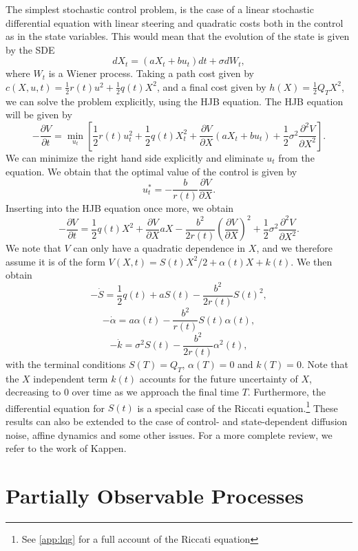 The simplest stochastic control problem, is the case of a linear stochastic differential equation with linear steering and quadratic costs both in the control as in the state variables. This would mean that the evolution of the state is given by the SDE
\begin{equation}
\label{eq:ctl_diff_dyn}
dX_t = \left(a X_t + b u_t\right) dt + \sigma dW_t,
\end{equation}
where $W_t$ is a Wiener process. Taking a path cost given by $c(X,u,t) = \frac{1}{2} r(t) u^2 + \frac{1}{2} q(t) X^2$, and a final cost given by $h(X) = \frac{1}{2} Q_T X^2$, we can solve the problem explicitly, using the HJB equation. The HJB equation will be given by
$$
-\frac{\partial V}{\partial t} = \min_{u_t} \left[\frac{1}{2} r(t) u_t^2 + \frac{1}{2} q(t) X_t^2 + \frac{\partial V}{\partial X} \left(aX_t  + bu_t\right) + \frac{1}{2}\sigma^2 \frac{\partial^2 V}{\partial X^2} \right].
$$
We can minimize the right hand side explicitly and eliminate $u_t$ from the equation. We obtain that the optimal value of the control is given by
$$
u^*_t = -\frac{b}{r(t)} \frac{\partial V}{\partial X}.
$$
Inserting into the HJB equation once more, we obtain
$$
-\frac{\partial V}{\partial t} = \frac{1}{2} q(t) X^2 +\frac{\partial V}{\partial X} a X - \frac{b^2}{2 r(t)} \left(\frac{\partial V}{\partial X}\right)^2 + \frac{1}{2}\sigma^2 \frac{\partial^2 V}{\partial X^2}.
$$
We note that $V$ can only have a quadratic dependence in $X$, and we therefore assume it is of the form $V(X,t) = S(t) X^2/2 + \alpha(t) X + k(t)$. We then obtain
$$
-\dot{S} = \frac{1}{2} q(t) + a S(t) - \frac{b^2}{2 r(t) } S(t)^2,
$$
$$
-\dot{\alpha} = a \alpha(t)-\frac{b^2}{r(t)} S(t)\alpha(t),
$$
$$
-\dot{k} = \sigma^2 S(t)-\frac{b^2}{2 r(t)} \alpha^2(t),
$$
with the terminal conditions $S(T) = Q_T$, $\alpha(T) = 0$ and $k(T)=0$. Note that the $X$ independent term $k(t)$ accounts for the future uncertainty of $X$, decreasing to $0$ over time as we approach the final time $T$. Furthermore, the differential equation for $S(t)$ is a special case of the Riccati equation.\footnote{See \ref{app:lqg} for a full account of the Riccati equation} These results can also be extended to the case of control- and state-dependent diffusion noise, affine dynamics and some other issues. For a more complete review, we refer to the work of Kappen\cite{Kappen2011}.

\section{Partially Observable Processes}

